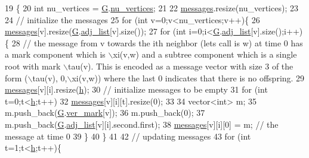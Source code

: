 \begin{DoxyCode}
19 \{
20   \textcolor{keywordtype}{int} nu\_vertices = \hyperlink{classgraph__message_abffce6d6a7868da0e747425569759f0f}{G}.\hyperlink{classmarked__graph_acf79c6aeb8f32614cb14a5baaa6c9f9b}{nu\_vertices};
21 
22   \hyperlink{classgraph__message_a06a1d1ab91b4891c65ea80205566f800}{messages}.resize(nu\_vertices);
23 
24   \textcolor{comment}{// initialize the messages}
25   \textcolor{keywordflow}{for} (\textcolor{keywordtype}{int} v=0;v<nu\_vertices;v++)\{
26     \hyperlink{classgraph__message_a06a1d1ab91b4891c65ea80205566f800}{messages}[v].resize(\hyperlink{classgraph__message_abffce6d6a7868da0e747425569759f0f}{G}.\hyperlink{classmarked__graph_a1a0bf7ca413a278763f7c878b3b6fd6f}{adj\_list}[v].size());
27     \textcolor{keywordflow}{for} (\textcolor{keywordtype}{int} i=0;i<\hyperlink{classgraph__message_abffce6d6a7868da0e747425569759f0f}{G}.\hyperlink{classmarked__graph_a1a0bf7ca413a278763f7c878b3b6fd6f}{adj\_list}[v].size();i++)\{
28       \textcolor{comment}{// the message from v towards the ith neighbor (lets call is w) at time 0 has a mark component which
       is \(\backslash\)xi(v,w) and a subtree component which is a single root with mark \(\backslash\)tau(v). This is encoded as a message
       vector with size 3 of the form (\(\backslash\)tau(v), 0,\(\backslash\)xi(v,w)) where the last 0 indicates that there is no offspring.}
29       \hyperlink{classgraph__message_a06a1d1ab91b4891c65ea80205566f800}{messages}[v][i].resize(\hyperlink{classgraph__message_a934d63ed7275c211e13c6fb68824ed46}{h});
30       \textcolor{comment}{// initialize messages to be empty}
31       \textcolor{keywordflow}{for} (\textcolor{keywordtype}{int} t=0;t<\hyperlink{classgraph__message_a934d63ed7275c211e13c6fb68824ed46}{h};t++)
32         \hyperlink{classgraph__message_a06a1d1ab91b4891c65ea80205566f800}{messages}[v][i][t].resize(0);
33 
34       vector<int> m;
35       m.push\_back(\hyperlink{classgraph__message_abffce6d6a7868da0e747425569759f0f}{G}.\hyperlink{classmarked__graph_ac83e9377dd4d8bb95be1ac949b127296}{ver\_mark}[v]);
36       m.push\_back(0);
37       m.push\_back(\hyperlink{classgraph__message_abffce6d6a7868da0e747425569759f0f}{G}.\hyperlink{classmarked__graph_a1a0bf7ca413a278763f7c878b3b6fd6f}{adj\_list}[v][i].second.first);
38       \hyperlink{classgraph__message_a06a1d1ab91b4891c65ea80205566f800}{messages}[v][i][0] = m; \textcolor{comment}{// the message at time 0}
39     \}
40   \}
41 
42   \textcolor{comment}{// updating messages}
43   \textcolor{keywordflow}{for} (\textcolor{keywordtype}{int} t=1;t<\hyperlink{classgraph__message_a934d63ed7275c211e13c6fb68824ed46}{h};t++)\{

\end{DoxyCode}
